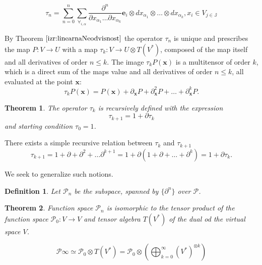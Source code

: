 \documentclass{article}
\newcommand{\JJ}{\mathbb{J}}
\newcommand{\e}{\mathbf{e}}
\newcommand{\x}{\mathbf{x}}
\newcommand{\dP}{\mathcal{P}}
\newcommand{\D}{\partial}
\newcommand{\sumd}{\tau}
\newtheorem{definicija}{Definition}[section]
\newtheorem{izrek}{Theorem}[section]
\begin{document}
  
  \begin{equation}
  	\sumd_n=\sum\limits_{n=0}^{n}\sum_{\forall_{i,\alpha}}\frac{\partial^n}{\partial
  		    x_{\alpha_1}\ldots \partial x_{\alpha_k}}\e_i\otimes
  		  dx_{\alpha_1}\otimes\ldots \otimes dx_{\alpha_k} , x_i\in V_{j\in\JJ}
  \end{equation}
  
  By Theorem $\ref{izr:linearnaNeodvisnost}$ the operator $\sumd_n$ is unique and prescribes the map $P: V\to U$ with a map $\sumd_k:V\to
U\otimes T(V^*)$, composed of the map itself and all derivatives of order $n\le k$. The image $\sumd_kP(\x)$ is a multitensor of order $k$, which is a direct sum of the maps value and all derivatives of order $n\le k$, all evaluated at the point $\x$:
\begin{equation}
  \label{eq:multi_odvod}
  \sumd_kP(\x) = P(\x)+\D_\x P + \D^2_\x P + \ldots + \D^k_\x P.
\end{equation}
\begin{izrek}\label{izr:tauRek}
  The operator $\sumd_k$ is recursively defined with the expression
  \begin{equation}
    \label{eq:potenca(1+d)}
    \sumd_{k+1}=1+\D\sumd_{k}
  \end{equation}
and starting condition $\tau_0=1$.
\end{izrek}
There exists a simple recursive relation between $\sumd_k$ and $\sumd_{k+1}$
\begin{equation}
   \label{eq:rekurzija}
   \sumd_{k+1} = 1 + \D +\D^2+\ldots \D^{k+1} = 1+\D(1+\D+\ldots +\D^{k}) = 1+\D\sumd_k.
\end{equation} 

We seek to generalize such notions.

\begin{definicija}\label{def:P_n}
Let $\dP_n$ be the subspace, spanned by $\{\partial^n\}$ over $\dP$.
 \end{definicija}
 
 \begin{izrek}\label{izr:P_n}
 	Function space $\dP_n$ is isomorphic to the tensor product of the function space $\dP_0:V\to V$ and tensor algebra $T(V^*)$ of the dual od the virtual space $V$.
 	
 	\begin{equation}
 	\label{eq:P_algebra}
 	 	    \dP\infty\simeq \dP_0\otimes T(V^*) = \dP_0 \otimes\left(\bigoplus_{k=0}^\infty (V^*)^{\otimes k} \right)
 	\end{equation}
 \end{izrek}
 
\end{document}
